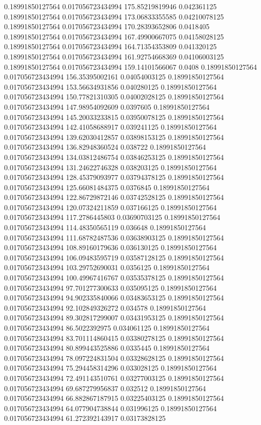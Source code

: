 0.18991850127564 0.017056723434994 175.85219819946 0.042361125
0.18991850127564 0.017056723434994 173.06833355585 0.04210078125
0.18991850127564 0.017056723434994 170.28393652806 0.0418405
0.18991850127564 0.017056723434994 167.49900667075 0.04158028125
0.18991850127564 0.017056723434994 164.71354353809 0.041320125
0.18991850127564 0.017056723434994 161.92754668369 0.04106003125
0.18991850127564 0.017056723434994 159.14101566067 0.0408
0.18991850127564 0.017056723434994 156.35395002161 0.04054003125
0.18991850127564 0.017056723434994 153.56634931856 0.040280125
0.18991850127564 0.017056723434994 150.77821310305 0.04002028125
0.18991850127564 0.017056723434994 147.98954092609 0.0397605
0.18991850127564 0.017056723434994 145.20033233815 0.03950078125
0.18991850127564 0.017056723434994 142.41058688917 0.039241125
0.18991850127564 0.017056723434994 139.62030412857 0.03898153125
0.18991850127564 0.017056723434994 136.82948360524 0.038722
0.18991850127564 0.017056723434994 134.03812486754 0.03846253125
0.18991850127564 0.017056723434994 131.24622746328 0.038203125
0.18991850127564 0.017056723434994 128.45379093977 0.03794378125
0.18991850127564 0.017056723434994 125.66081484375 0.0376845
0.18991850127564 0.017056723434994 122.86729872146 0.03742528125
0.18991850127564 0.017056723434994 120.07324211859 0.037166125
0.18991850127564 0.017056723434994 117.2786445803 0.03690703125
0.18991850127564 0.017056723434994 114.48350565119 0.036648
0.18991850127564 0.017056723434994 111.68782487536 0.03638903125
0.18991850127564 0.017056723434994 108.89160179636 0.036130125
0.18991850127564 0.017056723434994 106.09483595719 0.03587128125
0.18991850127564 0.017056723434994 103.29752690031 0.0356125
0.18991850127564 0.017056723434994 100.49967416767 0.03535378125
0.18991850127564 0.017056723434994 97.701277300633 0.035095125
0.18991850127564 0.017056723434994 94.902335840066 0.03483653125
0.18991850127564 0.017056723434994 92.102849326272 0.034578
0.18991850127564 0.017056723434994 89.302817299007 0.03431953125
0.18991850127564 0.017056723434994 86.5022392975 0.034061125
0.18991850127564 0.017056723434994 83.701114860415 0.03380278125
0.18991850127564 0.017056723434994 80.899443525886 0.0335445
0.18991850127564 0.017056723434994 78.097224831504 0.03328628125
0.18991850127564 0.017056723434994 75.294458314296 0.033028125
0.18991850127564 0.017056723434994 72.491143510761 0.03277003125
0.18991850127564 0.017056723434994 69.687279956837 0.032512
0.18991850127564 0.017056723434994 66.882867187915 0.03225403125
0.18991850127564 0.017056723434994 64.077904738844 0.031996125
0.18991850127564 0.017056723434994 61.272392143917 0.03173828125
